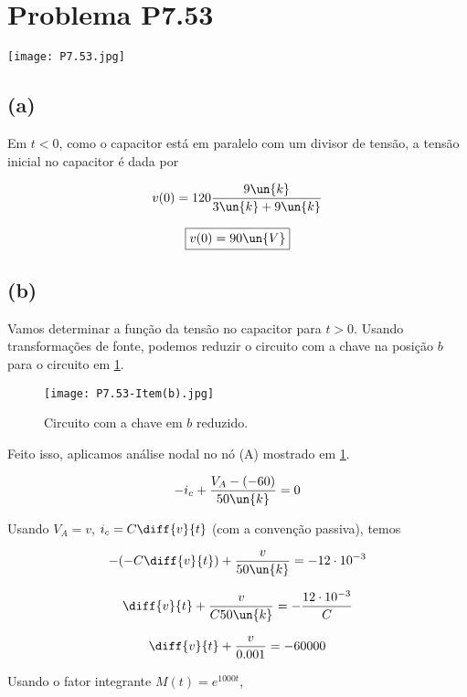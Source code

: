 
\section*{Problema P7.53}

\renewcommand*\thesection{7.53}

\begin{center}
    \texttt{[image: P7.53.jpg]}
\end{center}

\subsection*{(a)}

Em $t<0$, como o capacitor está em paralelo com um divisor de tensão, a tensão inicial no capacitor é dada por  

\[ v(0) = 120\frac{9\un{k}}{3\un{k} + 9\un{k}}  \]

\[ \boxed{v(0) = 90 \un{V}}  \]

\subsection*{(b)}

Vamos determinar a função da tensão no capacitor para $t>0$. Usando transformações de fonte,
podemos reduzir o circuito com a chave na posição $b$ para o circuito em \ref*{fig:7.53.1}.

\begin{figure}[hb]
    \centering
    \caption{Circuito com a chave em $b$ reduzido.}
      \centering
      \texttt{[image: P7.53-Item(b).jpg]} \\
    \label{fig:7.53.1}
\end{figure}

Feito isso, aplicamos análise nodal no nó (A) mostrado em \ref*{fig:7.53.1}.

\[ -i_c + \frac{V_A - (-60)}{50\un{k}} = 0  \]

Usando $V_A = v$, $i_c = C\diff{v}{t}$ (com a convenção passiva), temos

\[ -(-C\diff{v}{t}) + \frac{v}{50\un{k}} = - 12 \cdot 10^{-3} \]

\[\diff{v}{t} + \frac{v}{C50\un{k}} = - \frac{12 \cdot 10^{-3}}{C} \]

\[ \diff{v}{t} + \frac{v}{0.001} = -60000 \]

Usando o fator integrante $M(t) = e^{1000t}$,

